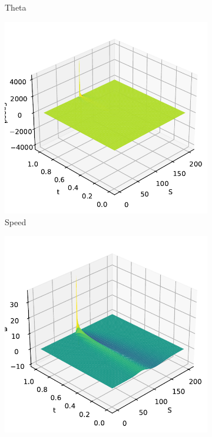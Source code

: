 \begin{figure}[H]
\begin{subfigure}[b]{0.3\linewidth}
        \caption{Theta}
    \end{subfigure}
    \begin{subfigure}[b]{0.3\linewidth}
        \includegraphics[width=\linewidth]{Imagenes/Parte1/6_Sols/Binary_Call/Binary_Call_Speed.pdf}
        \caption{Speed}
    \end{subfigure}
    \begin{subfigure}[b]{0.3\linewidth}
        \includegraphics[width=\linewidth]{Imagenes/Parte1/6_Sols/Binary_Call/Binary_Call_Vega.pdf}

\end{subfigure}
\end{figure}
